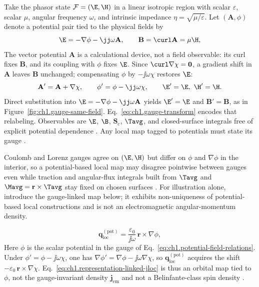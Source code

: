 Take the phasor state $\mathcal{F}=(\E,\H)$ in a linear isotropic region with scalar $\varepsilon$, scalar $\mu$, angular frequency $\omega$, and intrinsic impedance $\eta=\sqrt{\mu/\varepsilon}$. Let $(\mathbf{A},\phi)$ denote a potential pair tied to the physical fields by
\begin{equation}
\label{eq:ch1.potential-field-relations}
\E=-\nabla\phi-\jj\omega\mathbf{A},\qquad \mathbf{B}=\curl\mathbf{A}=\mu\H,
\end{equation}
The vector potential $\mathbf{A}$ is a calculational device, not a field observable: its curl fixes $\mathbf{B}$, and its coupling with $\phi$ fixes $\E$. Since $\curl\nabla\chi=\mathbf{0}$, a gradient shift in $\mathbf{A}$ leaves $\mathbf{B}$ unchanged; compensating $\phi$ by $-\jj\omega\chi$ restores $\E$:
\begin{equation}
\label{eq:ch1.gauge-transform}
\mathbf{A}'=\mathbf{A}+\nabla\chi,\qquad \phi'=\phi-\jj\omega\chi,\qquad \E'=\E,\ \H'=\H.
\end{equation}
Direct substitution into $\E=-\nabla\phi-\jj\omega\mathbf{A}$ yields $\E'=\E$ and $\mathbf{B}'=\mathbf{B}$, as in Figure~\ref{fig:ch1.gauge-same-field}. Eq.~\eqref{eq:ch1.gauge-transform} encodes that relabeling. Observables are $\E$, $\B$, $\mathbf{S}_\mathrm{c}$, $\Tavg$, and closed-surface integrals free of explicit potential dependence \cite{maxwell1873,belinfante1940}. \label{eq:ch1.gauge-observable-invariance}\label{eq:ch1.observable-admissibility-triad}\label{eq:ch1.observable-charge-continuous-triad}
Any local map tagged to potentials must state its gauge \cite{belinfante1940}.

Coulomb and Lorenz gauges agree on $(\E,\H)$ but differ on $\phi$ and $\nabla\phi$ in the interior, so a potential-based local map may disagree pointwise between gauges even while traction and angular-flux integrals built from $\Tavg$ and $\Mavg=\mathbf{r}\times\Tavg$ stay fixed on chosen surfaces \cite{belinfante1940,maxwell1873}. For illustration alone, introduce the gauge-linked map below; it exhibits non-uniqueness of potential-based local constructions and is not an electromagnetic angular-momentum density.


\begin{equation}
\label{eq:ch1.representation-linked-jloc}
\mathbf{q}_{\mathrm{loc}}^{(\mathrm{pot})}
=
\frac{\varepsilon_0}{\jj\omega}\,\mathbf{r}\times\nabla\phi,
\end{equation}
Here $\phi$ is the scalar potential in the gauge of Eq.~\eqref{eq:ch1.potential-field-relations}. Under $\phi'=\phi-\jj\omega\chi$, one has $\nabla\phi'=\nabla\phi-\jj\omega\nabla\chi$, so $\mathbf{q}_{\mathrm{loc}}^{(\mathrm{pot})}$ acquires the shift $-\varepsilon_0\,\mathbf{r}\times\nabla\chi$. Eq.~\eqref{eq:ch1.representation-linked-jloc} is thus an orbital map tied to $\phi$, not the gauge-invariant density $\mathbf{j}_{\mathrm{em}}$ and not a Belinfante-class spin density \cite{belinfante1940,stratton1941}.

